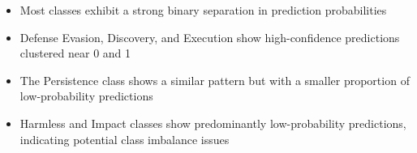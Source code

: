             \begin{itemize}
                \item Most classes exhibit a strong binary separation in prediction probabilities
                \item Defense Evasion, Discovery, and Execution show high-confidence predictions clustered near 0 and 1
                \item The Persistence class shows a similar pattern but with a smaller proportion of low-probability predictions
                \item Harmless and Impact classes show predominantly low-probability predictions, indicating potential class imbalance issues
            \end{itemize}
            
        \vspace{-0.5cm}
            
